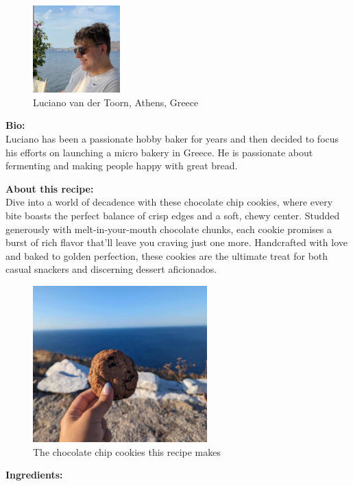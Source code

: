 \begin{figure}[h]
    \centering
    \includegraphics[width=0.3\textwidth]{chocolate-chip-cookies-author}
    \caption{Luciano van der Toorn, Athens, Greece}
\end{figure}

\noindent\textbf{Bio:}\\
Luciano has been a passionate hobby baker for years
and then decided to focus his efforts on launching
a micro bakery in Greece. He is passionate about
fermenting and making people happy with great bread.

\noindent\textbf{About this recipe:}\\
Dive into a world of decadence with these chocolate chip cookies,
where every bite boasts the perfect balance of crisp edges and a soft,
chewy center. Studded generously with melt-in-your-mouth chocolate chunks,
each cookie promises a burst of rich flavor that'll leave you craving just one more.
Handcrafted with love and baked to golden perfection,
these cookies are the ultimate treat for both casual snackers and discerning dessert aficionados.

\begin{figure}[h]
    \centering
    \includegraphics[width=0.6\textwidth]{chocolate-chip-cookies.jpg}
    \caption{The chocolate chip cookies this recipe makes}
\end{figure}

\noindent\textbf{Ingredients:}

